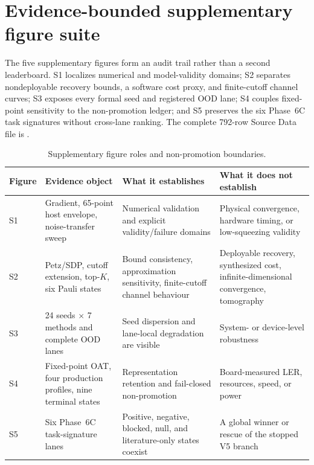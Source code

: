 \documentclass[11pt]{article}
\begin{document}
\clearpage
\appendix

\section{Evidence-bounded supplementary figure suite}

\setcounter{figure}{0}
\renewcommand{\thefigure}{S\arabic{figure}}

The five supplementary figures form an audit trail rather than a second
leaderboard.  S1 localizes numerical and model-validity domains; S2 separates
nondeployable recovery bounds, a software cost proxy, and finite-cutoff channel
curves; S3 exposes every formal seed and registered OOD lane; S4 couples
fixed-point sensitivity to the non-promotion ledger; and S5 preserves the six
Phase~6C task signatures without cross-lane ranking.  The complete 792-row
Source Data file is .

\begin{table}[htbp]
\centering
\small
\caption{Supplementary figure roles and non-promotion boundaries.}
\label{tab:supplement-roles}
\begin{tabularx}{\textwidth}{@{}l L{0.28\textwidth} Y L{0.25\textwidth}@{}}
\toprule
Figure & Evidence object & What it establishes & What it does not establish \\
\midrule
S1 & Gradient, 65-point host envelope, noise-transfer sweep & Numerical validation and explicit validity/failure domains & Physical convergence, hardware timing, or low-squeezing validity \\
S2 & Petz/SDP, cutoff extension, top-$K$, six Pauli states & Bound consistency, approximation sensitivity, finite-cutoff channel behaviour & Deployable recovery, synthesized cost, infinite-dimensional convergence, tomography \\
S3 & 24 seeds $\times$ 7 methods and complete OOD lanes & Seed dispersion and lane-local degradation are visible & System- or device-level robustness \\
S4 & Fixed-point OAT, four production profiles, nine terminal states & Representation retention and fail-closed non-promotion & Board-measured LER, resources, speed, or power \\
S5 & Six Phase~6C task-signature lanes & Positive, negative, blocked, null, and literature-only states coexist & A global winner or rescue of the stopped V5 branch \\
\bottomrule
\end{tabularx}
\end{table}
\end{document}

